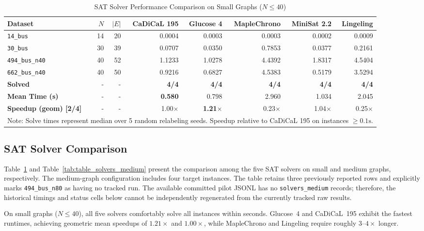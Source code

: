 \documentclass[a4paper,fleqn]{cas-sc}
\begin{document}
\begin{table}
\centering
\caption{SAT Solver Performance Comparison on Small Graphs ($N \le 40$)}
\label{tab:table_solvers_small}
\begin{tabular}{lrrrrrrr}
\toprule
Dataset & $N$ & $|E|$ & CaDiCaL 195 & Glucose 4 & MapleChrono & MiniSat 2.2 & Lingeling \\
\midrule
\texttt{14\_bus} & 14 & 20 & 0.0004 & 0.0003 & 0.0003 & 0.0002 & 0.0009 \\
\texttt{30\_bus} & 30 & 39 & 0.0707 & 0.0350 & 0.7853 & 0.0377 & 0.2161 \\
\texttt{494\_bus\_n40} & 40 & 52 & 1.1233 & 1.0278 & 4.4392 & 1.8317 & 4.5404 \\
\texttt{662\_bus\_n40} & 40 & 50 & 0.9216 & 0.6827 & 4.5383 & 0.5179 & 3.5294 \\
\midrule
\textbf{Solved} & - & - & \textbf{4/4} & \textbf{4/4} & \textbf{4/4} & \textbf{4/4} & \textbf{4/4} \\
\textbf{Mean Time (s)} & - & - & \textbf{0.580} & 0.798 & 2.960 & 1.034 & 2.045 \\
\textbf{Speedup (geom) [2/4]} & - & - & 1.00$\times$ & \textbf{1.21$\times$} & 0.23$\times$ & 1.04$\times$ & 0.25$\times$ \\
\bottomrule
\multicolumn{8}{l}{\footnotesize Note: Solve times represent median over 5 random relabeling seeds. Speedup relative to CaDiCaL 195 on instances $\ge 0.1\text{s}$.} \\
\end{tabular}
\end{table}

\subsection{SAT Solver Comparison}
Table~\ref{tab:table_solvers_small} and Table~\ref{tab:table_solvers_medium} present the comparison among the five SAT solvers on small and medium graphs, respectively. The medium-graph configuration includes four target instances. The table retains three previously reported rows and explicitly marks \texttt{494\_bus\_n80} as having no tracked run. The available committed pilot JSONL has no \texttt{solvers\_medium} records; therefore, the historical timings and status cells below cannot be independently regenerated from the currently tracked raw results.

On small graphs ($N \le 40$), all five solvers comfortably solve all instances within seconds. Glucose~4 and CaDiCaL~195 exhibit the fastest runtimes, achieving geometric mean speedups of $1.21\times$ and $1.00\times$, while MapleChrono and Lingeling require roughly $3\text{--}4\times$ longer.
\end{document}
